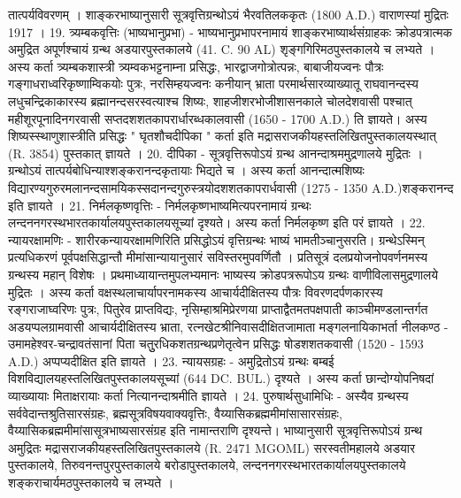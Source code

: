 तात्पर्यविवरणम् । शाङ्करभाष्यानुसारी सूत्रवृत्तिग्रन्थोऽयं भैरवतिलककृतः (1800 A.D.) वाराणस्यां मुद्रितः 1917 ।
19. त्र्यम्बकवृत्तिः (भाष्यभानुप्रभा) -
भाष्यभानुप्रभापरनामायं शाङ्करभाष्यार्थसंग्राहकः क्रोडपत्रात्मक अमुद्रित अपूर्णश्चायं ग्रन्थ अडयारपुस्तकालये (41. C. 90 AL) शृङ्गगिरिमठपुस्तकालये च लभ्यते । अस्य कर्ता त्र्यम्बकशास्त्री त्र्यम्वकभट्टनाम्ना प्रसिद्धः, भारद्वाजगोत्रोत्पन्नः, बाबाजीयज्वनः पौत्रः गङ्गाधराध्वरिकृष्णाम्विकयोः पुत्रः, नरसिम्हयज्वनः कनीयान् भ्राता परमार्थसारव्याख्यातू राघवानन्दस्य लधुचन्द्रिकाकारस्य ब्रह्मानन्दसरस्वत्याश्च शिष्यः, शाहजीशरभोजीशासनकाले चोलदेशवासी पश्चात् महीशूरपूनादिनगरवासी सप्तदशशतकापरार्धारब्धकालवासी (1650 - 1700 A.D.) ति ज्ञायते। अस्य शिष्यस्स्थाणुशास्त्रीति प्रसिद्धः " घृतशौचदीपिका " कर्ता इति मद्रासराजकीयहस्तलिखितपुस्तकालयस्थात् (R. 3854) पुस्तकात् ज्ञायते । 
20. दीपिका - 
सूत्रवृत्तिरूपोऽयं ग्रन्थ आनन्दाश्रममुद्रणालये मुद्रितः । ग्रन्थोऽयं तात्पर्यबोधिन्याश्शङ्करानन्दकृतायाः भिद्यते च । अस्य कर्ता आनन्दात्मशिष्यः विद्यारण्यगुरुरमलानन्दसामयिकस्सदानन्दगुरुस्त्रयोदशशतकापरार्धवासी (1275 - 1350 A.D.)शङ्करानन्द इति ज्ञायते ।
21. निर्मलकृष्णवृत्तिः -
निर्मलकृष्णभाष्यमित्यपरनामायं ग्रन्थः लन्दननगरस्थभारतकार्यालयपुस्तकालयसूच्यां दृश्यते। अस्य कर्ता निर्मलकृष्ण इति परं ज्ञायते । 
22. न्यायरक्षामणिः -
शारीरकन्यायरक्षामणिरिति प्रसिद्धोऽयं वृत्तिग्रन्थः भाष्यं भामतीञ्चानुसरति। ग्रन्थेऽस्मिन् प्रत्यधिकरणं पूर्वपक्षसिद्धान्तौ मीमांसान्यायानुसारं सविस्तरमुपवर्णितौ । प्रतिसूत्रं दलप्रयोजनोपवर्णनमस्य ग्रन्थस्य महान् विशेषः । प्रथमाध्यायान्तमुपलभ्यमानः भाष्यस्य क्रोडपत्ररूपोऽय ग्रन्थः वाणीविलासमुद्रणालये मुद्रितः । अस्य कर्ता वक्षस्थलाचार्यापरनामकस्य आचार्यदीक्षितस्य पौत्रः विवरणदर्पणकारस्य रङ्गराजाघ्वरिणः पुत्रः, पितुरेव प्राप्तविद्यः, नृसिम्हाश्रमिप्रेरणया प्राप्ताद्वैतमतपक्षपाती काञ्चीमण्डलान्तर्गत अडयप्पलग्रामवासी आचार्यदीक्षितस्य भ्राता, रत्नखेटश्रीनिवासदीक्षितजामाता मङ्गलनायिकाभर्ता नीलकण्ठ - उमामहेश्वर-चन्द्रावतंसानां पिता चतुुरधिकशतग्रन्थप्रणेतृत्वेन प्रसिद्धः षोडशशतकवासी (1520 - 1593 A.D.) अप्पप्यदीक्षित इति ज्ञायते । 
23. न्यायसग्रहः - 
अमुद्रितोऽयं ग्रन्थः बम्बई विशविद्यालयहस्तलिखितपुस्तकालयसूच्यां (644 DC. BUL.) दृश्यते । अस्य कर्ता छान्दोग्योपनिषदां व्याख्यायाः मिताक्षरायाः कर्ता नित्यानन्दाश्रमीति ज्ञायते । 
24. पुरुषार्थसुधामिधिः - 
अस्यैव ग्रन्थस्य सर्ववेदान्तश्रुतिसारसंग्रहः, ब्रह्मसूत्रविषयवाक्यवृत्तिः, वैय्यासिकब्रह्ममीमांसासारसंग्रहः, वैय्यासिकब्रह्ममीमांसासूत्रभाष्यसारसंग्रह इति नामान्तराणि दृश्यन्ते। भाष्यानुसारी सूत्रवृत्तिरूपोऽयं ग्रन्थ अमुद्रितः मद्रासराजकीयहस्तलिखितपुस्तकालये (R. 2471 MGOML) सरस्वतीमहालये अडयार पुस्तकालये, तिरुवनन्तपुरपुस्तकालये बरोडापुस्तकालये, लन्दननगरस्थभारतकार्यालयपुस्तकालये शङ्कराचार्यमठपुस्तकालये च लभ्यते । 
